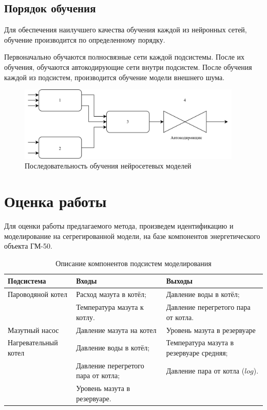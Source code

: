 \subsection{Порядок обучения}

Для обеспечения наилучшего качества обучения каждой из нейронных сетей,
обучение производится по определенному порядку. 

Первоначально обучаются полносвязные сети каждой подсистемы. После их обучения,
обучаются автокодирующие сети внутри подсистем. После обучения каждой из
подсистем, производится обучение модели внешнего шума. 

\begin{figure}[H]
  \begin{center}
    \includegraphics[width=0.95\textwidth]{figures/nn_full_learning.png}
  \end{center}
  \caption{Последовательность обучения нейросетевых
  моделей}\label{fig:nn:learning}
\end{figure}



\section{Оценка работы}

Для оценки работы предлагаемого метода, произведем идентификацию и моделирование на сегрегированной модели, на базе компонентов энергетического объекта ГМ-50. 

\begin{table}[H]
\caption{Описание компонентов подсистем моделирования}\label{tab:subsystems}
\begin{tabular}{|p{}|p{}|p{}|}
    \hline
    Подсистема  & Входы & Выходы \\
    \hline 
    Пароводяной котел & Расход мазута в котёл;  & Давление воды в котёл; \\
                      & Температура мазута к котлу. & Давление перегретого пара от котла. \\
    \hline 
    Мазутный насос    & Давление мазута на котел & Уровень мазута в резервуаре \\
    \hline
    Нагревательный котел & Давление воды в котёл; & Температура мазута в резервуаре средняя;\\
                         & Давление перегретого пара от котла; & Давление пара от котла ($log$).\\
                         & Уровень мазута в резервуаре. & \\
    \hline
\end{tabular}
\end{table}

